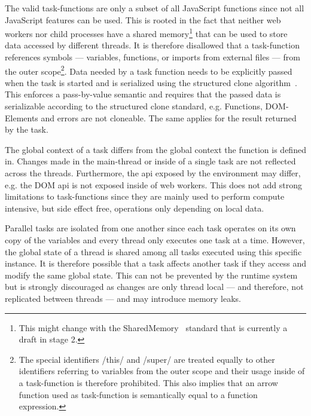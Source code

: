 The valid task-functions are only a subset of all JavaScript functions since not all JavaScript features can be used. This is rooted in the fact that neither web workers nor child processes have a shared memory\footnote{This might change with the SharedMemory~\cite{Ecma2016} standard that is currently a draft in stage 2.} that can be used to store data accessed by different threads. It is therefore disallowed that a task-function references symbols --- variables, functions, or imports from external files --- from the outer scope\footnote{The special identifiers \javascriptinline/this/ and \javascriptinline/super/ are treated equally to other identifiers referring to variables from the outer scope and their usage inside of a task-function is therefore prohibited. This also implies that an arrow function used as task-function is semantically equal to a function expression.}. Data needed by a task function needs to be explicitly passed when the task is started and is serialized using the structured clone algorithm~\cite[Section 2.9.4]{WHATWG2016}. This enforces a pass-by-value semantic and requires that the passed data is serializable according to the structured clone standard, e.g. Functions, DOM-Elements and errors are not cloneable. The same applies for the result returned by the task. 

The global context of a task differs from the global context the function is defined in. Changes made in the main-thread or inside of a single task are not reflected across the threads. Furthermore, the api exposed by the environment may differ, e.g. the DOM api is not exposed inside of web workers. This does not add strong limitations to task-functions since they are mainly used to perform compute intensive, but side effect free,  operations only depending on local data.

Parallel tasks are isolated from one another since each task operates on its own copy of the variables and every thread only executes one task at a time. However, the global state of a thread is shared among all tasks executed using this specific instance. It is therefore possible that a task affects another task if they access and modify the same global state. This can not be prevented by the runtime system but is strongly discouraged as changes are only thread local --- and therefore, not replicated between threads --- and may introduce memory leaks. 

